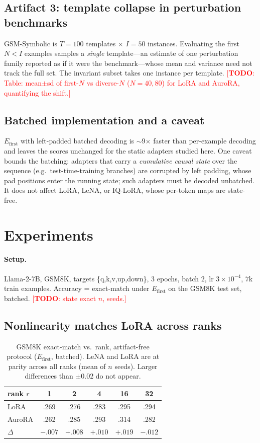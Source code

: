 \documentclass[preprint,11pt]{elsarticle}
\newcommand{\todo}[1]{\textcolor{red}{[\textbf{TODO}: #1]}}
\begin{document}
\subsection{Artifact 3: template collapse in perturbation benchmarks}
GSM-Symbolic is $T{=}100$ templates $\times$ $I{=}50$ instances. Evaluating the first $N\!<\!I$ examples samples a
\emph{single} template---an estimate of one perturbation family reported as if it were the benchmark---whose mean and
variance need not track the full set. The invariant subset takes one instance per template. \todo{Table: mean$\pm$sd of
first-$N$ vs diverse-$N$ ($N{=}40,80$) for LoRA and AuroRA, quantifying the shift.}

\subsection{Batched implementation and a caveat}
$E_{\text{first}}$ with left-padded batched decoding is $\sim$9$\times$ faster than per-example decoding and leaves the
scores unchanged for the static adapters studied here. One caveat bounds the batching: adapters that carry a
\emph{cumulative causal state} over the sequence (e.g.\ test-time-training branches) are corrupted by left padding, whose
pad positions enter the running state; such adapters must be decoded unbatched. It does not affect LoRA, LeNA, or IQ-LoRA,
whose per-token maps are state-free.

\section{Experiments}
\label{sec:exp}
\paragraph{Setup.} Llama-2-7B, GSM8K, targets \{q,k,v,up,down\}, $3$ epochs, batch $2$, lr $3\times10^{-4}$, $7$k train
examples. Accuracy = exact-match under $E_{\text{first}}$ on the GSM8K test set, batched. \todo{state exact $n$, seeds.}

\subsection{Nonlinearity matches LoRA across ranks}
\begin{table}[t]\centering
\caption{GSM8K exact-match vs.\ rank, artifact-free protocol ($E_{\text{first}}$, batched). LeNA and LoRA are at
parity across all ranks (mean of $n$ seeds). Larger differences than $\pm0.02$ do not appear.}
\label{tab:rankcurve}
\begin{tabular}{lccccc}
\toprule
rank $r$ & 1 & 2 & 4 & 16 & 32\\
\midrule
LoRA               & .269 & .276 & .283 & .295 & .294\\
AuroRA \citep{aurora} & .262 & .285 & .293 & .314 & .282\\
$\Delta$           & $-.007$ & $+.008$ & $+.010$ & $+.019$ & $-.012$\\
\bottomrule
\end{tabular}
\end{table}
\end{document}
